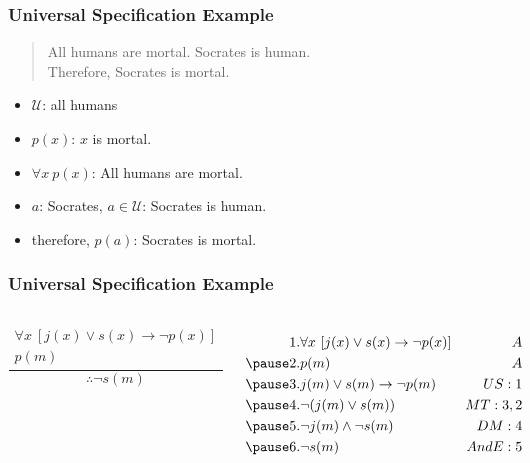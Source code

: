 \documentclass[dvipsnames]{beamer}
\begin{document}
\begin{frame}
  \frametitle{Universal Specification Example}

  \begin{quote}
    All humans are mortal. Socrates is human.\\
    Therefore, Socrates is mortal.
  \end{quote}

  \pause
  \begin{itemize}
    \item $\mathcal{U}$: all humans
    \item $p(x)$: $x$ is mortal.
    \item $\forall x~p(x)$: All humans are mortal.
    \item $a$: Socrates, $a \in \mathcal{U}$: Socrates is human.
    \item therefore, $p(a)$: Socrates is mortal.
  \end{itemize}
\end{frame}

\begin{frame}
  \frametitle{Universal Specification Example}

  \begin{small}
  \begin{columns}
    \[
    \frac
      {
        \begin{array}{c}
          \forall x~[j(x) \vee s(x) \rightarrow \neg p(x)]\\
          p(m)
        \end{array}
      }
      {
        \therefore \neg s(m)
      }
    \]

    \pause
    \begin{eqnarray*}
      1. & \forall x~[j(x) \vee s(x) \rightarrow \neg p(x)] & A\\\pause
      2. & p(m)                                             & A\\\pause
      3. & j(m) \vee s(m) \rightarrow \neg p(m)             & US:1\\\pause
      4. & \neg (j(m) \vee s(m))                            & MT:3,2\\\pause
      5. & \neg j(m) \wedge \neg s(m)                       & DM:4\\\pause
      6. & \neg s(m)                                        & AndE:5
    \end{eqnarray*}
  \end{columns}
  \end{small}
\end{frame}
\end{document}
